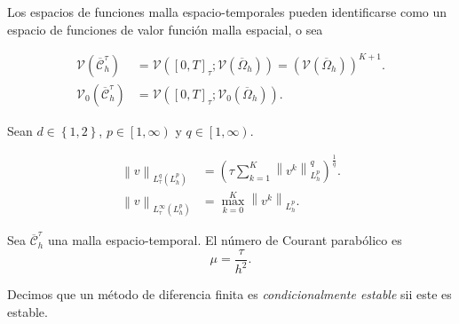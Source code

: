 Los espacios de funciones malla espacio-temporales pueden
identificarse como un espacio de funciones de valor función malla
espacial, o sea

\begin{align*}
    \mathcal{V}
    \left(
    \overline{\mathcal{C}}^{\tau}_{h}
    \right) & =
    \mathcal{V}
    \left(
    \left[0,T\right]_{\tau};
    \mathcal{V}
    \left(\overline{\Omega}_{h}\right)
    \right)=
    {
    \left(
    \mathcal{V}\left(\overline{\Omega}_{h}\right)
    \right)
    }^{K+1}.    \\
    \mathcal{V}_{0}
    \left(
    \overline{\mathcal{C}}^{\tau}_{h}
    \right) & =
    \mathcal{V}
    \left(
    \left[0,T\right]_{\tau};
    \mathcal{V}_{0}\left(\overline{\Omega}_{h}\right)
    \right).
\end{align*}

\begin{definition}
    Sean
    \begin{math}
        d\in\left\{1,2\right\}
    \end{math},
    \begin{math}
        p\in
        \left[1,\infty\right)
    \end{math}
    y
    \begin{math}
        q\in\left[1,\infty\right)
    \end{math}.

    \begin{align*}
        {\left\|v\right\|}_{
            L^{q}_{\tau}\left(L^{p}_{h}\right)
        }
         & =
        {\left(
        \tau\sum_{k=1}^{K}
        \left\|v^{k}\right\|^{q}_{L^{p}_{h}}
        \right)}^{\frac{1}{q}}. \\
        {\left\|v\right\|}_{L^{\infty}_{\tau}\left(L^{p}_{h}\right)}
         & =
        \max^{K}_{k=0}
        {\left\|v^{k}\right\|}_{L^{p}_{h}}.
    \end{align*}
\end{definition}

\begin{definition}
    Sea $\overline{\mathcal{C}}^{\tau}_{h}$ una malla
    espacio-temporal.
    El número de Courant parabólico es
    \begin{equation*}
        \mu=
        \dfrac{\tau}{h^{2}}.
    \end{equation*}
\end{definition}

\begin{definition}
    Decimos que un método de diferencia finita es
    \emph{condicionalmente estable} sii este es estable.
\end{definition}

